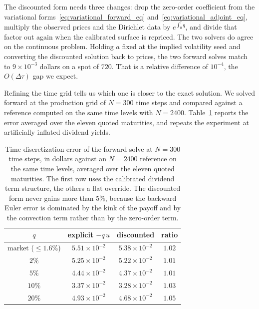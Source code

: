 The discounted form needs three changes: drop the zero-order coefficient from the variational
forms~\eqref{eq:variational_forward_eq} and~\eqref{eq:variational_adjoint_eq}, multiply the
observed prices and the Dirichlet data by $e^{\int_0^\tau q}$, and divide that factor out again
when the calibrated surface is repriced.
The two solvers do agree on the continuous problem.
Holding $a$ fixed at the implied volatility seed and converting the discounted solution back to
prices, the two forward solves match to $9\times 10^{-3}$ dollars on a spot of $720$.
That is a relative difference of $10^{-4}$, the $O(\Delta\tau)$ gap we expect.

Refining the time grid tells us which one is closer to the exact solution.
We solved forward at the production grid of $N = 300$ time steps and compared against a
reference computed on the same time levels with $N = 2400$.
Table~\ref{tab:discounted_pde} reports the error averaged over the eleven quoted maturities, and
repeats the experiment at artificially inflated dividend yields.

\begin{table}[h]
    \centering
    \begin{tabular}{c c c c}
        \toprule
        $q$ & explicit $-q\,u$ & discounted & ratio \\
        \midrule
        market ($\leq 1.6\%$) & $5.51\times10^{-2}$ & $5.38\times10^{-2}$ & $1.02$ \\
        $2\%$  & $5.25\times10^{-2}$ & $5.22\times10^{-2}$ & $1.01$ \\
        $5\%$  & $4.44\times10^{-2}$ & $4.37\times10^{-2}$ & $1.01$ \\
        $10\%$ & $3.37\times10^{-2}$ & $3.28\times10^{-2}$ & $1.03$ \\
        $20\%$ & $4.93\times10^{-2}$ & $4.68\times10^{-2}$ & $1.05$ \\
        \bottomrule
    \end{tabular}
    \caption{Time discretization error of the forward solve at $N = 300$ time steps, in dollars
             against an $N = 2400$ reference on the same time levels, averaged over the eleven
             quoted maturities. The first row uses the calibrated dividend term structure, the
             others a flat override. The discounted form never gains more than $5\%$, because
             the backward Euler error is dominated by the kink of the payoff and by the
             convection term rather than by the zero-order term.}
    \label{tab:discounted_pde}
\end{table}

